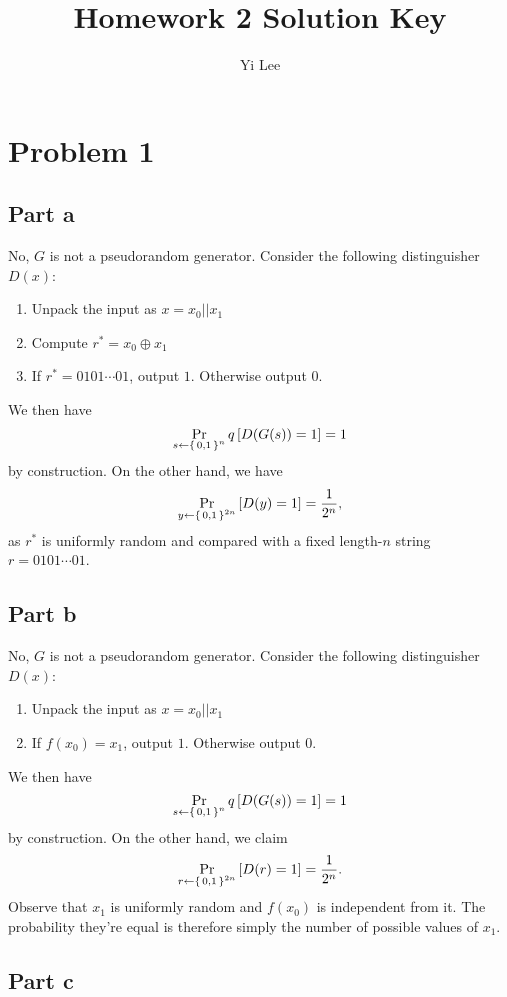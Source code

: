 \documentclass{article}
\title{Homework 2 Solution Key}
\author{Yi Lee}
\theoremstyle{definition}
\begin{document}


\maketitle

\section*{Problem 1}

\subsection*{Part a}

No, $G$ is not a pseudorandom generator.
Consider the following distinguisher $D(x)$:
\begin{enumerate}
    \item Unpack the input as $x=x_0||x_1$
    \item Compute $r^* = x_0 \oplus x_1$
    \item If $r^* = 0101\cdots01$, output $1$.
    Otherwise output $0$.
\end{enumerate}

We then have
$$\Pr_{s\gets\set{0, 1}^n}q\left[D(G(s))=1\right]=1$$
by construction.
On the other hand, we have
$$\Pr_{y\gets\set{0, 1}^{2n}}\left[D(y)=1\right]=\frac{1}{2^{n}},$$
as $r^*$ is uniformly random and compared with a fixed length-$n$ string $r=0101\cdots01$.

\subsection*{Part b}

No, $G$ is not a pseudorandom generator.
Consider the following distinguisher $D(x)$:
\begin{enumerate}
    \item Unpack the input as $x=x_0||x_1$
    \item If $f(x_0)=x_1$, output $1$.
    Otherwise output $0$.
\end{enumerate}
We then have
$$\Pr_{s\gets\set{0, 1}^n}q\left[D(G(s))=1\right]=1$$
by construction.
On the other hand, we claim
$$\Pr_{r\gets\set{0, 1}^{2n}}\left[D(r)=1\right]=\frac{1}{2^{n}}.$$
Observe that $x_1$ is uniformly random and $f(x_0)$ is independent from it.
The probability they're equal is therefore simply the number of possible values of $x_1$.

\subsection*{Part c}
\end{document}
